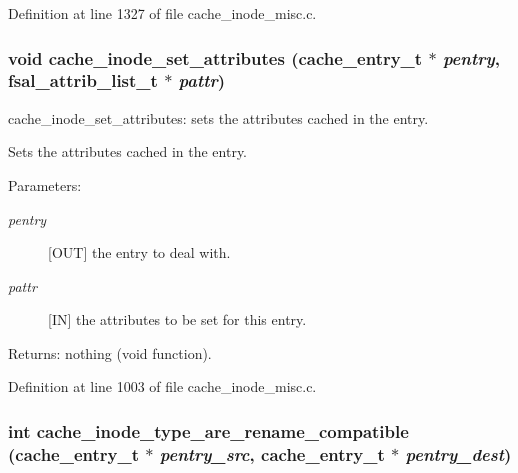 Definition at line 1327 of file cache\_\-inode\_\-misc.c.
\subsubsection[{cache\_\-inode\_\-set\_\-attributes}]{\setlength{\rightskip}{0pt plus 5cm}void cache\_\-inode\_\-set\_\-attributes (cache\_\-entry\_\-t $\ast$ {\em pentry}, \/  fsal\_\-attrib\_\-list\_\-t $\ast$ {\em pattr})}\label{cache__inode__misc_8c_7da7b52764bdb6c1a6d60a2a979322aa}


cache\_\-inode\_\-set\_\-attributes: sets the attributes cached in the entry.

Sets the attributes cached in the entry.

\begin{Desc}
\item[Parameters:]
\begin{description}
\item[{\em pentry}][OUT] the entry to deal with. \item[{\em pattr}][IN] the attributes to be set for this entry.\end{description}
\end{Desc}
\begin{Desc}
\item[Returns:]nothing (void function). \end{Desc}


Definition at line 1003 of file cache\_\-inode\_\-misc.c.
\subsubsection[{cache\_\-inode\_\-type\_\-are\_\-rename\_\-compatible}]{\setlength{\rightskip}{0pt plus 5cm}int cache\_\-inode\_\-type\_\-are\_\-rename\_\-compatible (cache\_\-entry\_\-t $\ast$ {\em pentry\_\-src}, \/  cache\_\-entry\_\-t $\ast$ {\em pentry\_\-dest})}\label{cache__inode__misc_8c_276225d5d7db59f532f94ca6cf32ab53}


